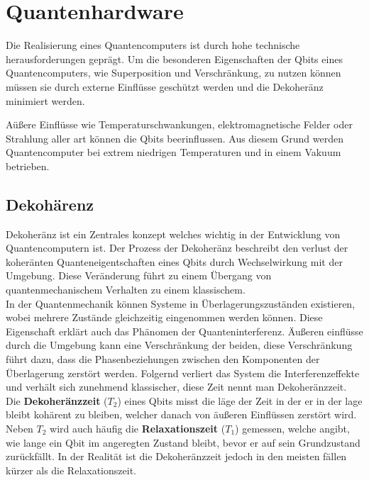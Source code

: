\section{Quantenhardware}
\label{sec:quantenhardware}

Die Realisierung eines Quantencomputers ist durch hohe technische herausforderungen geprägt. Um die besonderen Eigenschaften der Qbits eines Quantencomputers, wie Superposition und Verschränkung, zu nutzen können müssen sie durch externe Einflüsse geschützt werden und die Dekoheränz minimiert werden.

Aüßere Einflüsse wie Temperaturschwankungen, elektromagnetische Felder oder Strahlung aller art können die Qbits beerinflussen. Aus diesem Grund werden Quantencomputer bei extrem niedrigen Temperaturen und in einem Vakuum betrieben.

\subsection{Dekohärenz}
\label{sub:dekohaerenz}
Dekoheränz ist ein Zentrales konzept welches wichtig in der Entwicklung von Quantencomputern ist. Der Prozess der Dekoheränz beschreibt den verlust der koheränten Quanteneigentschaften eines Qbits durch Wechselwirkung mit der Umgebung.
Diese Veränderung führt zu einem Übergang von quantenmechanischem Verhalten zu einem klassischem.\\

In der Quantenmechanik können Systeme in Überlagerungszuständen existieren, wobei mehrere Zustände gleichzeitig eingenommen werden können. Diese Eigenschaft erklärt auch das Phänomen der Quanteninterferenz.
Äußeren einflüsse durch die Umgebung kann eine Verschränkung der beiden, diese Verschränkung führt dazu, dass die Phasenbeziehungen zwischen den Komponenten der Überlagerung zerstört werden.
Folgernd verliert das System die Interferenzeffekte und verhält sich zunehmend klassischer, diese Zeit nennt man Dekoheränzzeit.\\

Die {\bf Dekoheränzzeit} ($T_2$) eines Qbits misst die läge der Zeit in der er in der lage bleibt kohärent zu bleiben, welcher danach von äußeren Einflüssen zerstört wird.
Neben $T_2$ wird auch häufig die {\bf Relaxationszeit} ($T_1$) gemessen, welche angibt, wie lange ein Qbit im angeregten Zustand bleibt, bevor er auf sein Grundzustand zurückfällt.
In der Realität ist die Dekoheränzzeit jedoch in den meisten fällen kürzer als die Relaxationszeit.\\

